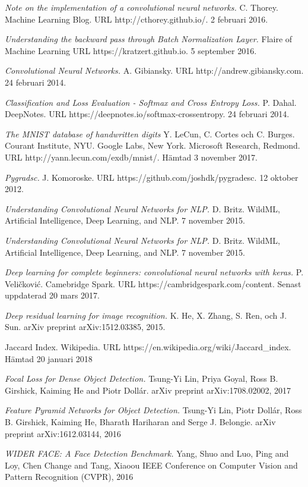 \documentclass[a4paper,11pt,twoside]{article}
\begin{document}
\begin{thebibliography}{99}
	\textit{Note on the implementation of a convolutional neural networks.}
	C. Thorey.
    Machine Learning Blog. 
    URL http://cthorey.github.io/.
	2 februari 2016.
	
	\textit{Understanding the backward pass through Batch Normalization Layer.}
	Flaire of Machine Learning
    URL https://kratzert.github.io.
	5 september 2016.
	
	\textit{Convolutional Neural Networks.}
	A. Gibiansky.
    URL http://andrew.gibiansky.com.
	24 februari 2014.
	
	\textit{Classification and Loss Evaluation - Softmax and Cross Entropy Loss.}
	P. Dahal. 
	DeepNotes.
    URL https://deepnotes.io/softmax-crossentropy.
	24 februari 2014.
	
	\textit{The MNIST database of handwritten digits}
	Y. LeCun, C. Cortes och C. Burges. Courant Institute, NYU. Google Labs, New York. Microsoft Research, Redmond. 
	URL http://yann.lecun.com/exdb/mnist/.
	Hämtad 3 november 2017.
	
	\textit{Pygradsc.}
	J. Komoroske.
	URL https://github.com/joshdk/pygradesc.
	12 oktober 2012.
	
	\textit{Understanding Convolutional Neural Networks for NLP.}
	D. Britz.
	WildML, Artificial Intelligence, Deep Learning, and NLP.
	7 november 2015.
	
	\textit{Understanding Convolutional Neural Networks for NLP.}
	D. Britz.
	WildML, Artificial Intelligence, Deep Learning, and NLP.
	7 november 2015.
	
	\textit{Deep learning for complete beginners: convolutional neural networks with keras.}
	P. Veličković.
	Camebridge Spark. 
	URL https://cambridgespark.com/content.
	Senast uppdaterad 20 mars 2017.


	\textit{Deep residual learning for image recognition.}
    K. He, X. Zhang, S. Ren, och J. Sun. 
    arXiv preprint arXiv:1512.03385, 2015.

	Jaccard Index. Wikipedia.
    URL https://en.wikipedia.org/wiki/Jaccard{\_}index. 
    Hämtad 20 januari 2018
    
	\textit{Focal Loss for Dense Object Detection.}
	Tsung{-}Yi Lin,
    Priya Goyal,
    Ross B. Girshick,
    Kaiming He and
    Piotr Doll{\'{a}}r.
    arXiv preprint arXiv:1708.02002, 2017

	\textit{Feature Pyramid Networks for Object Detection.}
	Tsung{-}Yi Lin,
               Piotr Doll{\'{a}}r,
               Ross B. Girshick,
               Kaiming He,
               Bharath Hariharan and
               Serge J. Belongie.
    arXiv preprint arXiv:1612.03144, 2016
    
	\textit{WIDER FACE: A Face Detection Benchmark.}
	Yang, Shuo and Luo, Ping and Loy, Chen Change and Tang, Xiaoou
    IEEE Conference on Computer Vision and Pattern Recognition (CVPR), 2016

\end{thebibliography}
\end{document}
